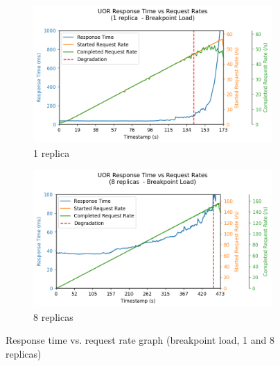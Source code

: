 \begin{figure}[h]
    \centering
    \begin{subfigure}{.5\textwidth}
      \centering
      \includegraphics[width=\linewidth]{figures/uor-replica-count-i1-graph-breakpoint.png}
      \caption{1 replica}
    \end{subfigure}%
    \begin{subfigure}{.5\textwidth}
      \centering
      \includegraphics[width=\linewidth]{figures/uor-replica-count-i4-graph-breakpoint.png}
      \caption{8 replicas}
    \end{subfigure}

    \caption{Response time vs. request rate graph (breakpoint load, 1 and 8 replicas)}
    \label{figure:uor-replica-count-graph-breakpoint}
\end{figure}

